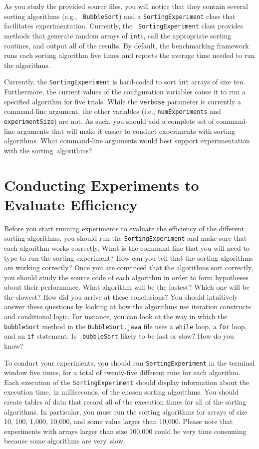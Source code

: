 As you study the provided source files, you will notice that they contain several sorting algorithms (e.g., {\tt
  BubbleSort}) and a {\tt SortingExperiment} class that facilitates experimentation. Currently, the {\tt
  SortingExperiment} class provides methods that generate random arrays of {\tt int}s, call the appropriate sorting
routines, and output all of the results.  By default, the benchmarking framework runs each sorting algorithm five times
and reports the average time needed to run the algorithms.

Currently, the {\tt SortingExperiment} is hard-coded to sort {\tt int} arrays of size ten. Furthermore, the current
values of the configuration variables cause it to run a specified algorithm for five trials.  While the {\tt verbose}
parameter is currently a command-line argument, the other variables (i.e., {\tt numExperiments} and {\tt
  experimentSize}) are not.  As such, you should add a complete set of command-line arguments that will make it easier
to conduct experiments with sorting algorithms. What command-line arguments would best support experimentation with 
the \mbox{sorting algorithms}?

\section*{Conducting Experiments to Evaluate Efficiency}

Before you start running experiments to evaluate the efficiency of the different sorting algorithms, you should run the
{\tt SortingExperiment} and make sure that each algorithm works correctly.  What is the command line that you will need
to type to run the sorting experiment? How can you tell that the sorting algorithms are working correctly? Once you are
convinced that the algorithms sort correctly, you should study the source code of each algorithm in order to form
hypotheses about their performance.  What algorithm will be the fastest? Which one will be the slowest? How did you
arrive at these conclusions? You should intuitively answer these questions by looking at how the algorithms use
iteration constructs and conditional logic. For instance, you can look at the way in which the {\tt bubbleSort} method
in the {\tt BubbleSort.java} file uses a {\tt while} loop, a {\tt for} loop, and an {\tt if} statement. Is {\tt
bubbleSort} likely to be fast or slow? How do you know?  

To conduct your experiments, you should run {\tt SortingExperiment} in the terminal window five times, for a total of
twenty-five different runs for each algorithm. Each execution of the {\tt SortingExperiment} should display information
about the execution time, in milliseconds, of the chosen sorting algorithms. You should create tables of data that
record all of the execution times for all of the sorting algorithms. In particular, you must run the sorting algorithms
for arrays of size 10, 100, 1,000, 10,000, and some value larger than 10,000. Please note that experiments 
with arrays larger than size 100,000 could be very time consuming because some algorithms are \mbox{very slow}.

